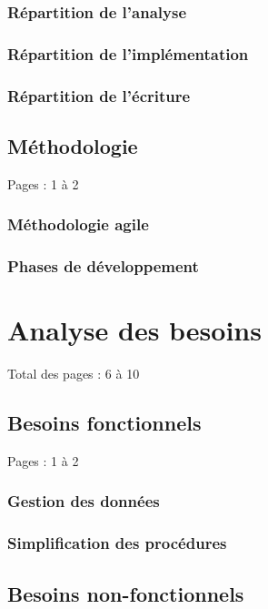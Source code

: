 \documentclass{eplmastersthesis_FR}
\begin{document}
			\subsection*{Répartition de l'analyse}
			\subsection*{Répartition de l'implémentation}
			\subsection*{Répartition de l'écriture}

		\section{Méthodologie}

			Pages : 1 à 2

			\subsection*{Méthodologie agile}
			\subsection*{Phases de développement}

	\chapter{Analyse des besoins}

		Total des pages : 6 à 10

		\section{Besoins fonctionnels}

			Pages : 1 à 2

			\subsection*{Gestion des données}
			\subsection*{Simplification des procédures}

		\section{Besoins non-fonctionnels}
\end{document}
